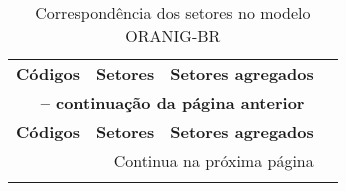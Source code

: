 \begin{apendicesenv}
	\begin{small}
		\begin{center}
			\setlength\LTleft{-1cm}
			\begin{longtable}{lccc}
				\caption{Correspondência dos setores no modelo ORANIG-BR}\label{ap:setores} \\
				
				\hline
				\multirow{2}{*}{\textbf{Códigos}} & \multirow{2}{*}{\textbf{Setores}} & \multirow{2}{*}{\textbf{Setores agregados}} \\
				&  &  \\ \hline \endfirsthead

				\multicolumn{3}{c}{{\bfseries \tablename\ \thetable{} -- continuação da página anterior}} \\
				\hline
				\multirow{2}{*}{\textbf{Códigos}} & \multirow{2}{*}{\textbf{Setores}} & \multirow{2}{*}{\textbf{Setores agregados}} \\
				&  &  \\ \hline \endhead

				\hline \multicolumn{3}{r}{{Continua na próxima página}} \\ \hline
				\endfoot

				\hline \endlastfoot


\end{longtable}
\end{center}
\end{small}
\end{apendicesenv}
